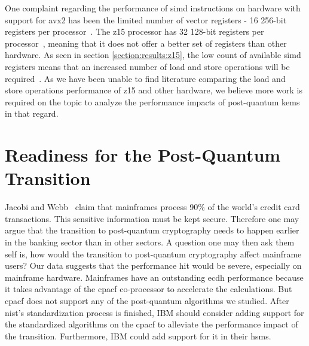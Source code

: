 One complaint regarding the performance of \gls{simd} instructions on hardware with support for \gls{avx2} has been the limited number of vector registers - 16 256-bit registers per processor~\cite{guneysu2013}. The \gls{z15} processor has 32 128-bit registers per processor~\cite{redbook:z15}, meaning that it does not offer a better set of registers than other hardware. As seen in section \ref{section:results:z15}, the low count of available \gls{simd} registers means that an increased number of load and store operations will be required~\cite{guneysu2013}. As we have been unable to find literature comparing the load and store operations performance of \gls{z15} and other hardware, we believe more work is required on the topic to analyze the performance impacts of \gls{post-quantum} \glspl{kem} in that regard.


\section{Readiness for the Post-Quantum Transition}
\label{section:discussion:post-quantum-transition-readiness}


Jacobi and Webb~\cite{jacobi2020} claim that mainframes process 90\% of the world's credit card transactions. This sensitive information must be kept secure. Therefore one may argue that the transition to \gls{post-quantum} cryptography needs to happen earlier in the banking sector than in other sectors. A question one may then ask them self is, how would the transition to \gls{post-quantum} cryptography affect mainframe users? Our data suggests that the performance hit would be severe, especially on mainframe hardware. Mainframes have an outstanding \gls{ecdh} performance because it takes advantage of the \gls{cpacf} co-processor to accelerate the calculations. But \gls{cpacf} does not support any of the post-quantum algorithms we studied. After \gls{nist}'s standardization process is finished, IBM should consider adding support for the standardized algorithms on the \gls{cpacf} to alleviate the performance impact of the transition. Furthermore, IBM could add support for it in their \glspl{hsm}.

